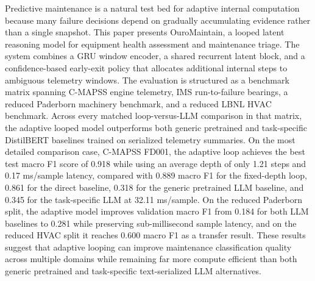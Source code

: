 Predictive maintenance is a natural test bed for adaptive internal computation because many failure decisions depend on gradually accumulating evidence rather than a single snapshot. This paper presents OuroMaintain, a looped latent reasoning model for equipment health assessment and maintenance triage. The system combines a GRU window encoder, a shared recurrent latent block, and a confidence-based early-exit policy that allocates additional internal steps to ambiguous telemetry windows. The evaluation is structured as a benchmark matrix spanning C-MAPSS engine telemetry, IMS run-to-failure bearings, a reduced Paderborn machinery benchmark, and a reduced LBNL HVAC benchmark. Across every matched loop-versus-LLM comparison in that matrix, the adaptive looped model outperforms both generic pretrained and task-specific DistilBERT baselines trained on serialized telemetry summaries. On the most detailed comparison case, C-MAPSS FD001, the adaptive loop achieves the best test macro F1 score of 0.918 while using an average depth of only 1.21 steps and 0.17 ms/sample latency, compared with 0.889 macro F1 for the fixed-depth loop, 0.861 for the direct baseline, 0.318 for the generic pretrained LLM baseline, and 0.345 for the task-specific LLM at 32.11 ms/sample. On the reduced Paderborn split, the adaptive model improves validation macro F1 from 0.184 for both LLM baselines to 0.281 while preserving sub-millisecond sample latency, and on the reduced HVAC split it reaches 0.600 macro F1 as a transfer result. These results suggest that adaptive looping can improve maintenance classification quality across multiple domains while remaining far more compute efficient than both generic pretrained and task-specific text-serialized LLM alternatives.
